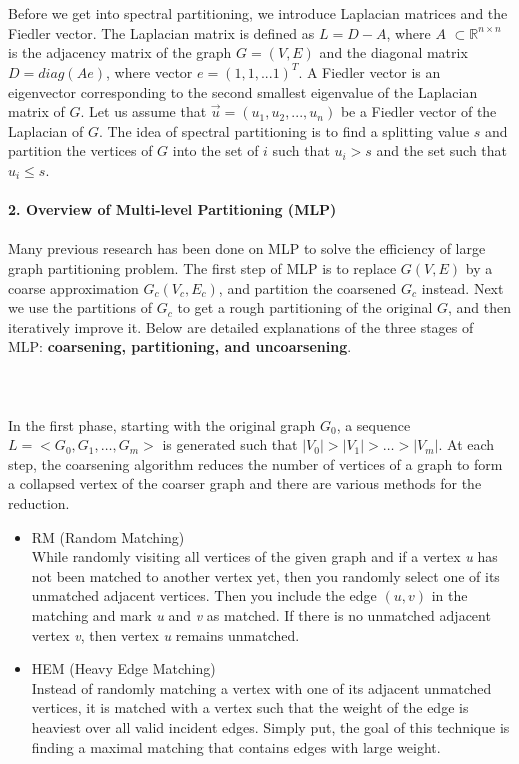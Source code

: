  \\\\
Before we get into spectral partitioning, we introduce Laplacian matrices and the Fiedler vector. The Laplacian matrix is defined as $L = D - A$, where $A$ $\subset \mathbb{R}^{n\times n}$ is the adjacency matrix of the graph $G = (V,E)$ and the diagonal matrix $D = diag(Ae)$, where vector $e = (1,1,...1)^{T}$. A Fiedler vector is an eigenvector corresponding to the second smallest eigenvalue of the Laplacian matrix of $G$. Let us assume that $\vec{u} = (u_1, u_2, ..., u_n)$ be a Fiedler vector of the Laplacian of $G$. The idea of spectral partitioning is to find a splitting value $s$ and partition the vertices of $G$ into the set of $i$ such that $u_i > s$ and the set such that $u_i \leq s$.
\\\\
\textbf{2. Overview of Multi-level Partitioning (MLP)} \\\\
Many previous research has been done on MLP to solve the efficiency of large graph partitioning problem. The first step of MLP is to replace $G(V,E)$ by a coarse approximation $G_c(V_c,E_c)$, and partition the coarsened $G_c$ instead. Next we use the partitions of $G_c$ to get a rough partitioning of the original $G$, and then iteratively improve it. Below are detailed explanations of the three stages of MLP: \textbf{coarsening, partitioning, and uncoarsening}.      
\\\\
 \\ \\
In the first phase, starting with the original graph $G_0$, a sequence $L=<G_0,G_1,\dots,G_m>$ is generated such that $|V_0| > |V_1| > \dots >|V_m|$. At each step, the coarsening algorithm reduces the number of vertices of a graph to form a collapsed vertex of the coarser graph and there are various methods for the reduction. \\
\begin{itemize}
    \item RM (Random Matching)\\
    While randomly visiting all vertices of the given graph and if a vertex \textit{u} has not been matched to another vertex yet, then you randomly select one of its unmatched adjacent vertices. Then you include the edge $(u, v)$ in the matching and mark \textit{u} and \textit{v} as matched. If there is no unmatched adjacent vertex \textit{v}, then vertex \textit{u} remains unmatched.
    \item HEM (Heavy Edge Matching) \\
    Instead of randomly matching a vertex with one of its adjacent unmatched vertices, it is matched with a vertex such that the weight of the edge is heaviest over all valid incident edges. Simply put, the goal of this technique is finding a maximal matching that contains edges with large weight. \\
\end{itemize}
